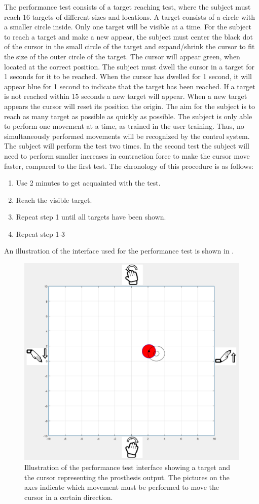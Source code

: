  The performance test consists of a target reaching test, where the subject must reach 16 targets of different sizes and locations. A target consists of a circle with a smaller circle inside. Only one target will be visible at a time. For the subject to reach a target and make a new appear, the subject must center the black dot of the cursor in the small circle of the target and expand/shrink the cursor to fit the size of the outer circle of the target. The cursor will appear green, when located at the correct position. The subject must dwell the cursor in a target for 1 seconds for it to be reached. When the cursor has dwelled for 1 second, it will appear blue for 1 second to indicate that the target has been reached. If a target is not reached within 15 seconds a new target will appear. When a new target appears the cursor will reset its position the origin. The aim for the subject is to reach as many target as possible as quickly as possible. The subject is only able to perform one movement at a time, as trained in the user training. Thus, no simultaneously performed movements will be recognized by the control system. The subject will perform the test two times. In the second test the subject will need to perform smaller increases in contraction force to make the cursor move faster, compared to the first test. The chronology of this procedure is as follows:

\begin{enumerate}
	\item Use 2 minutes to get acquainted with the test. 
	\item Reach the visible target.
	\item Repeat step 1 until all targets have been shown.
	\item Repeat step 1-3
\end{enumerate}

An illustration of the interface used for the performance test is shown in .

\begin{figure}[H]                 
	\includegraphics[width=.6\textwidth]{figures/xBackground/perftestGUI}  
	\caption{Illustration of the performance test interface showing a target and the cursor representing the prosthesis output. The pictures on the axes indicate which movement must be performed to move the cursor in a certain direction.}
	\label{fig:perftestGUI} 
\end{figure}

